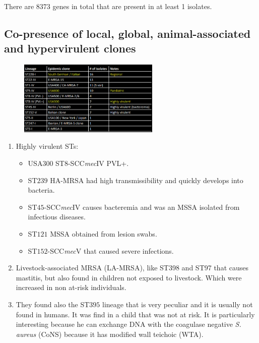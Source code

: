     There are $8373$ genes in total that are present in at least 1 isolates.

    \subsection{Co-presence of local, global, animal-associated and hypervirulent clones}

    \begin{figure}[h]
    \centering
    \includegraphics[width=0.6\textwidth]{Highlights.png}
    \caption{}
    \end{figure}

    \begin{multicols}{2}
        \begin{enumerate}
            \item Highly virulent STs:
            \begin{itemize}
                \item USA$300$ ST$8$-SCC\emph{mec}IV PVL+.
                \item ST$239$ HA-MRSA had high transmissibility and quickly develops into bacteria.
                \item ST$45$-SCC\emph{mec}IV causes bacteremia and was an MSSA isolated from infectious diseases.
                \item ST$121$ MSSA obtained from lesion swabs.
                \item ST$152$-SCC\emph{mec}V that caused severe infections.
            \end{itemize}
            \item Livestock-associated MRSA (LA-MRSA), like ST398 and ST97 that causes mastitis, but also found in children not exposed to livestock.
                Which were increased in non at-risk individuals.
            \item They found also the ST$395$ lineage that is very peculiar and it is usually not found in humans.
                It was find in a child that was not at risk.
                It is particularly interesting because he can exchange DNA with the coagulase negative \emph{S. aureus} (CoNS) because it has modified wall teichoic (WTA).
        \end{enumerate}
    \end{multicols}

